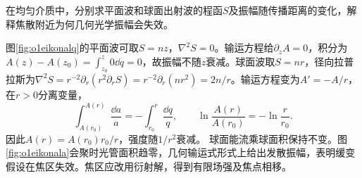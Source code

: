 \begin{example}\label{ex:o1eikonal}
在均匀介质中，分别求平面波和球面出射波的程函$S$及振幅随传播距离的变化，解释焦散附近为何几何光学振幅会失效。
\end{example}
\begin{solution}
图\ref{fig:o1eikonalq}的平面波可取$S=nz$，$\nabla^2S=0$。输运方程给$\partial_z A=0$，积分为$A(z)-A(z_0)=\int_{z_0}^z0\dd q=0$，故振幅不随$z$衰减。球面波取$S=nr$，径向拉普拉斯为$\nabla^2S=r^{-2}\partial_r(r^2\partial_rS)=r^{-2}\partial_r(nr^2)=2n/r$。输运方程变为$A'=-A/r$，在$r>0$分离变量，
\[
 \int_{A(r_0)}^{A(r)}\frac{\dd a}{a}
 =-\int_{r_0}^{r}\frac{\dd q}{q},\qquad
 \ln\frac{A(r)}{A(r_0)}=-\ln\frac r{r_0}.
\]
因此$A(r)=A(r_0)r_0/r$，强度随$1/r^2$衰减。
球面能流乘球面积保持不变。图\ref{fig:o1eikonala}会聚时光管面积趋零，几何输运式形式上给出发散振幅，表明缓变假设在焦区失效。焦区应改用衍射解，得到有限场强及焦点相移。
\end{solution}
